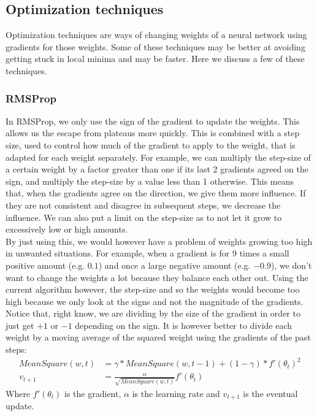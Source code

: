 \documentclass[a4paper, 11pt]{article}
\begin{document}
\subsection{Optimization techniques}
Optimization techniques are ways of changing weights of a neural network using gradients for those weights. Some of these techniques may be better at avoiding getting stuck in local minima and may be faster. Here we discuss a few of these techniques.

\subsubsection{RMSProp}

In RMSProp, we only use the sign of the gradient to update the weights. This allows us the escape from plateaus more quickly. This is combined with a step size, used to control how much of the gradient to apply to the weight, that is adapted for each weight separately. For example, we can multiply the step-size of a certain weight by a factor greater than one if its last 2 gradients agreed on the sign, and multiply the step-size by a value less than 1 otherwise. This means that, when the gradients agree on the direction, we give them more influence. If they are not consistent and disagree in subsequent steps, we decrease the influence. We can also put a limit on the step-size as to not let it grow to excessively low or high amounts.\\
By just using this, we would however have a problem of weights growing too high in unwanted situations. For example, when a gradient is for 9 times a small positive amount (e.g. $0.1$) and once a large negative amount (e.g. $-0.9$), we don't want to change the weights a lot because they balance each other out. Using the current algorithm however, the step-size and so the weights would become too high because we only look at the signs and not the magnitude of the gradients.\\
Notice that, right know, we are dividing by the size of the gradient in order to just get $+1$ or $-1$ depending on the sign. It is however better to divide each weight by a moving average of the squared weight using the gradients of the past steps:
\begin{align}
MeanSquare(w, t) &= \gamma * MeanSquare(w, t-1) + (1 - \gamma) * f'(\theta_t)^2 \\
v_{t+1} &= \frac{\alpha}{\sqrt{MeanSquare(w,t)}}f'(\theta_t)
\end{align}
Where $f'(\theta_t)$ is the gradient, $\alpha$ is the learning rate and $v_{t+1}$ is the eventual update.
\end{document}
